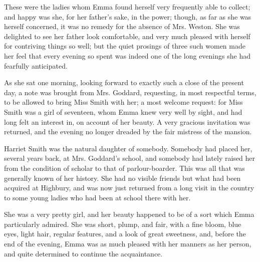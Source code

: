 These were the ladies whom Emma found herself very frequently able to collect; and happy was she, for her father's sake, in the power; though, as far as she was herself concerned, it was no remedy for the absence of Mrs. Weston. She was delighted to see her father look comfortable, and very much pleased with herself for contriving things so well; but the quiet prosings of three such women made her feel that every evening so spent was indeed one of the long evenings she had fearfully anticipated.

As she sat one morning, looking forward to exactly such a close of the present day, a note was brought from Mrs. Goddard, requesting, in most respectful terms, to be allowed to bring Miss Smith with her; a most welcome request: for Miss Smith was a girl of seventeen, whom Emma knew very well by sight, and had long felt an interest in, on account of her beauty. A very gracious invitation was returned, and the evening no longer dreaded by the fair mistress of the mansion.

Harriet Smith was the natural daughter of somebody. Somebody had placed her, several years back, at Mrs. Goddard's school, and somebody had lately raised her from the condition of scholar to that of parlour-boarder. This was all that was generally known of her history. She had no visible friends but what had been acquired at Highbury, and was now just returned from a long visit in the country to some young ladies who had been at school there with her.

She was a very pretty girl, and her beauty happened to be of a sort which Emma particularly admired. She was short, plump, and fair, with a fine bloom, blue eyes, light hair, regular features, and a look of great sweetness, and, before the end of the evening, Emma was as much pleased with her manners as her person, and quite determined to continue the acquaintance.

